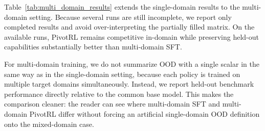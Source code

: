 Table~\ref{tab:multi_domain_results} extends the single-domain results to the multi-domain setting. Because several runs are still incomplete, we report only completed results and avoid over-interpreting the partially filled matrix. On the available runs, PivotRL remains competitive in-domain while preserving held-out capabilities substantially better than multi-domain SFT.

For multi-domain training, we do not summarize OOD with a single scalar in the same way as in the single-domain setting, because each policy is trained on multiple target domains simultaneously. Instead, we report held-out benchmark performance directly relative to the common base model. This makes the comparison cleaner: the reader can see where multi-domain SFT and multi-domain PivotRL differ without forcing an artificial single-domain OOD definition onto the mixed-domain case.
